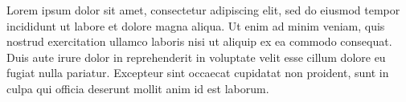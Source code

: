 \documentclass[12pt]{article}
\begin{document}
Lorem ipsum dolor sit amet, consectetur adipiscing elit, sed do eiusmod tempor incididunt ut labore et dolore magna aliqua. Ut enim ad minim veniam, quis nostrud exercitation ullamco laboris nisi ut aliquip ex ea commodo consequat. Duis aute irure dolor in reprehenderit in voluptate velit esse cillum dolore eu fugiat nulla pariatur. Excepteur sint occaecat cupidatat non proident, sunt in culpa qui officia deserunt mollit anim id est laborum.


\bibliografia
\end{document}
